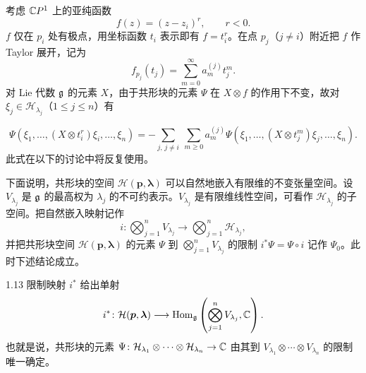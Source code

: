 考虑 $\mathbb{C}P^1$ 上的亚纯函数
\[
  f(z)=(z-z_i)^{r},\qquad r<0 .
\]
$f$ 仅在 $p_i$ 处有极点，用坐标函数 $t_i$ 表示即有 $f=t_i^{r}$。在点 $p_j$（$j\ne i$）附近把 $f$ 作 Taylor 展开，记为
\[
  f_{p_j}(t_j)=\sum_{m=0}^{\infty}a_m^{(j)}t_j^{m} .
\]
对 Lie 代数 $\mathfrak{g}$ 的元素 $X$，由于共形块的元素 $\Psi$ 在 $X\otimes f$ 的作用下不变，故对 $\xi_j\in\mathcal{H}_{\lambda_j}$（$1\le j\le n$）有

\begin{equation}
  \Psi(\xi_1,\dots,(X\otimes t_i^{r})\xi_i,\dots,\xi_n)
  =-\sum_{j,\,j\ne i}\ \sum_{m\ge0}a_m^{(j)}
  \Psi(\xi_1,\dots,(X\otimes t_j^{m})\xi_j,\dots,\xi_n) . \tag{1.15}
\end{equation}
此式在以下的讨论中将反复使用。


下面说明，共形块的空间 $\mathcal{H}(\bm p,\bm\lambda)$ 可以自然地嵌入有限维的不变张量空间。设 $V_{\lambda_j}$ 是 $\mathfrak{g}$ 的最高权为 $\lambda_j$ 的不可约表示。$V_{\lambda_j}$ 是有限维线性空间，可看作 $\mathcal{H}_{\lambda_j}$ 的子空间。把自然嵌入映射记作
\[
  i\colon\bigotimes_{j=1}^{n}V_{\lambda_j}\longrightarrow\bigotimes_{j=1}^{n}\mathcal{H}_{\lambda_j},
\]
并把共形块空间 $\mathcal{H}(\bm p,\bm\lambda)$ 的元素 $\Psi$ 到 $\bigotimes_{j=1}^{n}V_{\lambda_j}$ 的限制 $i^{*}\Psi=\Psi\circ i$ 记作 $\Psi_0$。此时下述结论成立。

\begin{lemma*}{1.13}
限制映射 $i^{*}$ 给出单射
\[
  i^{*}\colon\mathcal{H}(\bm p,\bm\lambda)\longrightarrow
  \operatorname{Hom}_{\mathfrak{g}}\left(\bigotimes_{j=1}^{n}V_{\lambda_j},\mathbb{C}\right).
\]
也就是说，共形块的元素 $\Psi\colon\mathcal{H}_{\lambda_1}\otimes\cdots\otimes\mathcal{H}_{\lambda_n}\to\mathbb{C}$ 由其到 $V_{\lambda_1}\otimes\cdots\otimes V_{\lambda_n}$ 的限制唯一确定。
\end{lemma*}


